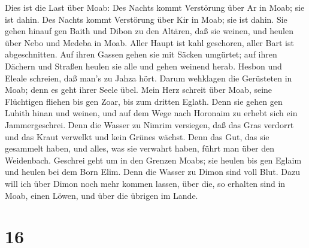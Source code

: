  Dies ist die Last über Moab: Des Nachts kommt Verstörung
über Ar in Moab; sie ist dahin. Des Nachts kommt Verstörung über Kir in
Moab; sie ist dahin.  Sie gehen hinauf gen Baith und Dibon
zu den Altären, daß sie weinen, und heulen über Nebo und Medeba in Moab.
Aller Haupt ist kahl geschoren, aller Bart ist abgeschnitten.
 Auf ihren Gassen gehen sie mit Säcken umgürtet; auf ihren
Dächern und Straßen heulen sie alle und gehen weinend herab.
 Hesbon und Eleale schreien, daß man's zu Jahza hört. Darum
wehklagen die Gerüsteten in Moab; denn es geht ihrer Seele übel.
 Mein Herz schreit über Moab, seine Flüchtigen fliehen bis
gen Zoar, bis zum dritten Eglath. Denn sie gehen gen Luhith hinan und
weinen, und auf dem Wege nach Horonaim zu erhebt sich ein
Jammergeschrei.  Denn die Wasser zu Nimrim versiegen, daß
das Gras verdorrt und das Kraut verwelkt und kein Grünes wächst.
 Denn das Gut, das sie gesammelt haben, und alles, was sie
verwahrt haben, führt man über den Weidenbach.  Geschrei
geht um in den Grenzen Moabs; sie heulen bis gen Eglaim und heulen bei
dem Born Elim.  Denn die Wasser zu Dimon sind voll Blut.
Dazu will ich über Dimon noch mehr kommen lassen, über die, so erhalten
sind in Moab, einen Löwen, und über die übrigen im Lande.

\hypertarget{section-15}{%
\section{16}\label{section-15}}

